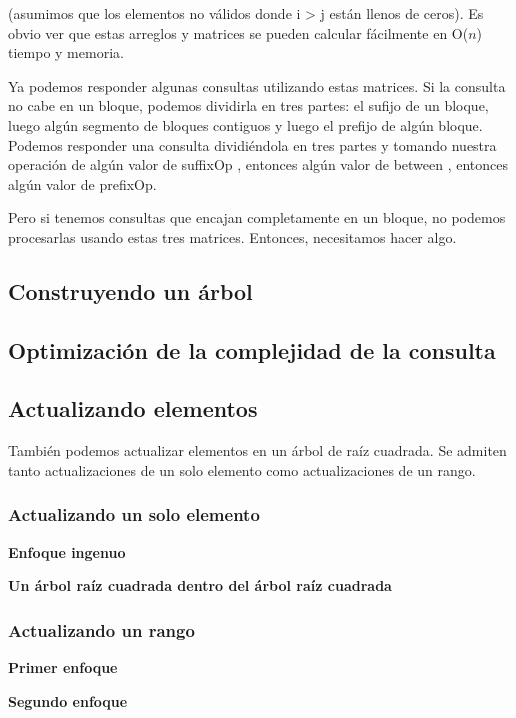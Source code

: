 (asumimos que los elementos no válidos donde i > j están llenos de ceros). Es obvio ver que estas arreglos y matrices se pueden calcular fácilmente en O($n$) tiempo y memoria.

Ya podemos responder algunas consultas utilizando estas matrices. Si la consulta no cabe en un bloque, podemos dividirla en tres partes: el sufijo de un bloque, luego algún segmento de bloques contiguos y luego el prefijo de algún bloque. Podemos responder una consulta dividiéndola en tres
partes y tomando nuestra operación de algún valor de suffixOp , entonces algún valor de between , entonces algún valor de prefixOp.

Pero si tenemos consultas que encajan completamente en un bloque, no podemos procesarlas usando estas tres matrices. Entonces, necesitamos
hacer algo.

\subsection{Construyendo un árbol}

\subsection{Optimización de la complejidad de la consulta}

\subsection{Actualizando elementos}

También podemos actualizar elementos en un árbol de raíz cuadrada. Se admiten tanto actualizaciones de un solo elemento como actualizaciones de un rango.

\subsubsection{Actualizando un solo elemento}

\textbf{Enfoque ingenuo}

\textbf{Un árbol raíz cuadrada dentro del árbol raíz cuadrada}

\subsubsection{Actualizando un rango}

\textbf{Primer enfoque}

\textbf{Segundo enfoque}



